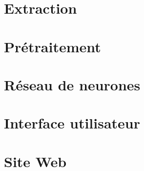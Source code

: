 \documentclass[]{report}
\begin{document}
	\chapter{Extraction} %
	\label{cha:extraction}
	
	


	\chapter{Pr\'etraitement} %
	\label{cha:pr'etraitement}
	
		

	
	\chapter{R\'eseau de neurones} %
	\label{cha:r'eseau_de_neurones}
	
		


	\chapter{Interface utilisateur} %
	\label{cha:interface_utilisateur}
	
		
	
	\chapter{Site Web} %
	\label{cha:site_web}
\end{document}
